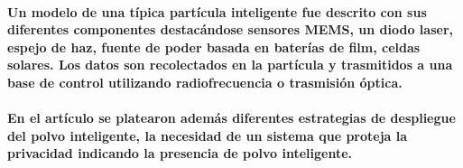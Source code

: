 \paragraph{
    Un modelo de una típica partícula inteligente fue descrito con sus diferentes componentes destacándose sensores MEMS, un diodo laser, espejo de haz, fuente de poder basada en baterías de film, celdas solares. Los datos son recolectados en  la partícula y trasmitidos a una base de control utilizando radiofrecuencia o trasmisión óptica.
}

\paragraph{
    En el artículo se platearon además diferentes estrategias de despliegue del polvo inteligente, la necesidad de un sistema que proteja la privacidad indicando la presencia de polvo inteligente.
}










